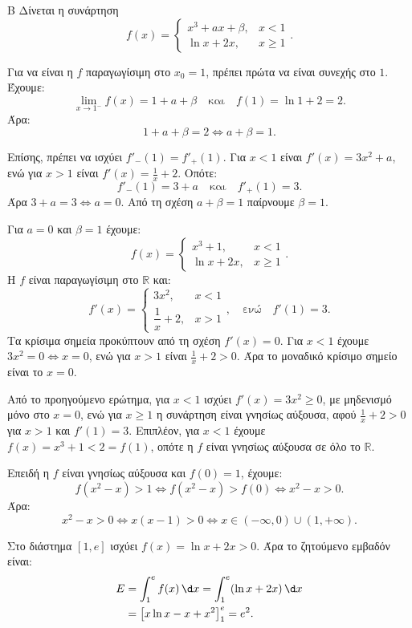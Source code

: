 \begin{thema}{Β}
Δίνεται η συνάρτηση
\[
f(x) = \begin{cases}
x^3 + ax + \beta, & x < 1 \\
\ln x + 2x, & x \ge 1
\end{cases}.
\]
\begin{erwthma}
\item Για να είναι η $f$ παραγωγίσιμη στο $x_0=1$, πρέπει πρώτα να είναι συνεχής στο $1$.
Έχουμε:
\[
\lim_{x\to1^-}f(x)=1+a+\beta
\quad \text{και} \quad
f(1)=\ln1+2=2.
\]
Άρα:
\[ 1+a+\beta=2 \Leftrightarrow a+\beta=1. \]

Επίσης, πρέπει να ισχύει $f'_-(1)=f'_+(1)$. Για $x<1$ είναι $f'(x)=3x^2+a$, ενώ για $x>1$ είναι $f'(x)=\frac{1}{x}+2$. Οπότε:
\[
f'_-(1)=3+a
\quad \text{και} \quad
f'_+(1)=3.
\]
Άρα $3+a=3\Leftrightarrow a=0$. Από τη σχέση $a+\beta=1$ παίρνουμε $\beta=1$.

\item Για $a=0$ και $\beta=1$ έχουμε:
\[
f(x)=\begin{cases}
x^3+1, & x<1\\
\ln x+2x, & x\ge1
\end{cases}.
\]
Η $f$ είναι παραγωγίσιμη στο $\mathbb{R}$ και:
\[
f'(x)=\begin{cases}
3x^2, & x<1\\
\dfrac{1}{x}+2, & x>1
\end{cases},
\quad \text{ενώ} \quad f'(1)=3.
\]
Τα κρίσιμα σημεία προκύπτουν από τη σχέση $f'(x)=0$. Για $x<1$ έχουμε $3x^2=0\Leftrightarrow x=0$, ενώ για $x>1$ είναι $\frac{1}{x}+2>0$.
Άρα το μοναδικό κρίσιμο σημείο είναι το $x=0$.

\item Από το προηγούμενο ερώτημα, για $x<1$ ισχύει $f'(x)=3x^2\ge0$, με μηδενισμό μόνο στο $x=0$, ενώ για $x\ge1$ η συνάρτηση είναι γνησίως αύξουσα, αφού $\frac{1}{x}+2>0$ για $x>1$ και $f'(1)=3$.
Επιπλέον, για $x<1$ έχουμε $f(x)=x^3+1<2=f(1)$, οπότε η $f$ είναι γνησίως αύξουσα σε όλο το $\mathbb{R}$.

Επειδή η $f$ είναι γνησίως αύξουσα και $f(0)=1$, έχουμε:
\[
f(x^2-x)>1 \Leftrightarrow f(x^2-x)>f(0)
\Leftrightarrow x^2-x>0.
\]
Άρα:
\[
x^2-x>0 \Leftrightarrow x(x-1)>0
\Leftrightarrow x\in(-\infty,0)\cup(1,+\infty).
\]

\item Στο διάστημα $[1,e]$ ισχύει $f(x)=\ln x+2x>0$. Άρα το ζητούμενο εμβαδόν είναι:
\begin{align*}
E&=\int_1^e f(x)\,\d x
=\int_1^e(\ln x+2x)\,\d x\\
&=\left[x\ln x-x+x^2\right]_1^e
=e^2.
\end{align*}
\end{erwthma}
\end{thema}

